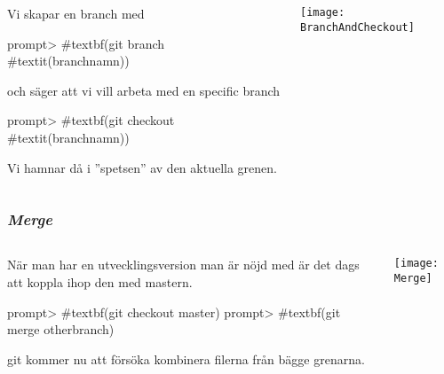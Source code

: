 \documentclass[swedish]{beamer}
\begin{document}
\begin{frame}[fragile]
  \begin{columns}
    \begin{column}{0.5\textwidth}
      Vi skapar en branch med 
      \begin{dialogue}
prompt> #textbf(git branch #textit(branchnamn))
      \end{dialogue}
och säger att vi vill arbeta med en specific branch
\begin{dialogue}
prompt> #textbf(git checkout #textit(branchnamn))  
\end{dialogue}
Vi hamnar då i ''spetsen'' av den aktuella grenen.
    \end{column}
    \begin{column}{0.5\textwidth}

\vspace{\baselineskip}

\texttt{[image: BranchAndCheckout]}
    \end{column}
  \end{columns}
  
\end{frame}

\begin{frame}[fragile]
\frametitle{\emph{Merge}}
\begin{columns}
\begin{column}{0.5\textwidth}
När man har en utvecklingsversion man är nöjd med är det dags att koppla ihop den med mastern.  
\begin{dialogue}
prompt> #textbf(git checkout master)
prompt> #textbf(git merge otherbranch)
\end{dialogue}

git kommer nu att försöka kombinera filerna från bägge grenarna.
\end{column}
\begin{column}{0.5\textwidth}

\vspace{\baselineskip}

\texttt{[image: Merge]}

\end{column}
\end{columns}
\end{frame}
\end{document}
